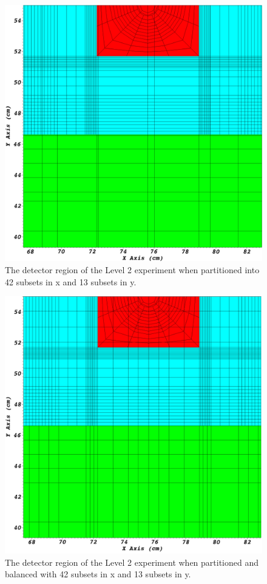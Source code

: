 \begin{figure}[ht]
\centering
\includegraphics[scale=0.15]{../../figures/level2_42x13_zoom.png}
\caption{The detector region of the Level 2 experiment when partitioned into 42 subsets in x and 13 subsets in y.}
\label{level2_42x13_zoom}
\end{figure}

\begin{figure}[ht]
\centering
\includegraphics[scale=0.15]{../../figures/level2_42x13_balanced_zoom.png}
\caption{The detector region of the Level 2 experiment when partitioned and balanced with 42 subsets in x and 13 subsets in y.}
\label{level2_42x13_balanced_zoom}
\end{figure}

